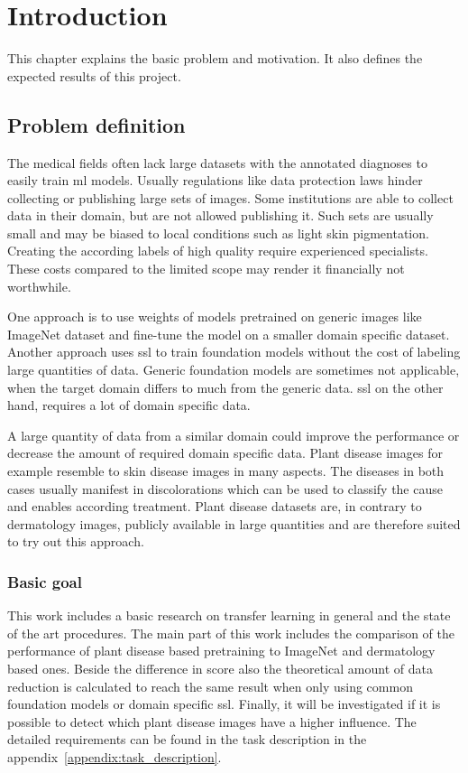 \chapter{Introduction}
This chapter explains the basic problem and motivation. It also defines the expected results of this project.

\section{Problem definition}

The medical fields often lack large datasets with the annotated diagnoses to easily train \gls{ml} models.%
Usually regulations like data protection laws hinder collecting or publishing large sets of images. Some institutions are able to collect data in their domain, but are not allowed publishing it. Such sets are usually small and may be biased to local conditions such as light skin pigmentation.
Creating the according labels of high quality require experienced specialists. These costs compared to the limited scope may render it financially not worthwhile.

One approach is to use weights of models pretrained on generic images like ImageNet dataset and fine-tune the model on a smaller domain specific dataset. Another approach uses \gls{ssl} to train foundation models without the cost of labeling large quantities of data. 
Generic foundation models are sometimes not applicable, when the target domain differs to much from the generic data.%
\gls{ssl} on the other hand, requires a lot of domain specific data.

A large quantity of data from a similar domain could improve the performance or decrease the amount of required domain specific data. 
Plant disease images for example resemble to skin disease images in many aspects. The diseases in both cases usually manifest in discolorations which can be used to classify the cause and enables according treatment.
Plant disease datasets are, in contrary to dermatology images, publicly available in large quantities and are therefore suited to try out this approach.


\subsection{Basic goal}
This work includes a basic research on transfer learning in general and the state of the art procedures. 
The main part of this work includes the comparison of the performance of plant disease based pretraining to ImageNet and dermatology based ones. Beside the difference in score also the theoretical amount of data reduction is calculated to reach the same result when only using common foundation models or domain specific \gls{ssl}. 
Finally, it will be investigated if it is possible to detect which plant disease images have a higher influence.
The detailed requirements can be found in the task description in the appendix~\ref{appendix:task_description}.

